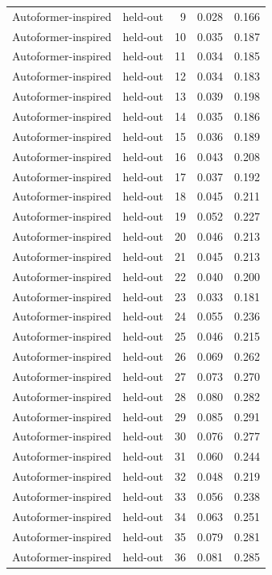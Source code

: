\begin{tabular}{llrrr}
Autoformer-inspired & held-out & 9 & 0.028 & 0.166 \\
Autoformer-inspired & held-out & 10 & 0.035 & 0.187 \\
Autoformer-inspired & held-out & 11 & 0.034 & 0.185 \\
Autoformer-inspired & held-out & 12 & 0.034 & 0.183 \\
Autoformer-inspired & held-out & 13 & 0.039 & 0.198 \\
Autoformer-inspired & held-out & 14 & 0.035 & 0.186 \\
Autoformer-inspired & held-out & 15 & 0.036 & 0.189 \\
Autoformer-inspired & held-out & 16 & 0.043 & 0.208 \\
Autoformer-inspired & held-out & 17 & 0.037 & 0.192 \\
Autoformer-inspired & held-out & 18 & 0.045 & 0.211 \\
Autoformer-inspired & held-out & 19 & 0.052 & 0.227 \\
Autoformer-inspired & held-out & 20 & 0.046 & 0.213 \\
Autoformer-inspired & held-out & 21 & 0.045 & 0.213 \\
Autoformer-inspired & held-out & 22 & 0.040 & 0.200 \\
Autoformer-inspired & held-out & 23 & 0.033 & 0.181 \\
Autoformer-inspired & held-out & 24 & 0.055 & 0.236 \\
Autoformer-inspired & held-out & 25 & 0.046 & 0.215 \\
Autoformer-inspired & held-out & 26 & 0.069 & 0.262 \\
Autoformer-inspired & held-out & 27 & 0.073 & 0.270 \\
Autoformer-inspired & held-out & 28 & 0.080 & 0.282 \\
Autoformer-inspired & held-out & 29 & 0.085 & 0.291 \\
Autoformer-inspired & held-out & 30 & 0.076 & 0.277 \\
Autoformer-inspired & held-out & 31 & 0.060 & 0.244 \\
Autoformer-inspired & held-out & 32 & 0.048 & 0.219 \\
Autoformer-inspired & held-out & 33 & 0.056 & 0.238 \\
Autoformer-inspired & held-out & 34 & 0.063 & 0.251 \\
Autoformer-inspired & held-out & 35 & 0.079 & 0.281 \\
Autoformer-inspired & held-out & 36 & 0.081 & 0.285 \\

\end{tabular}
